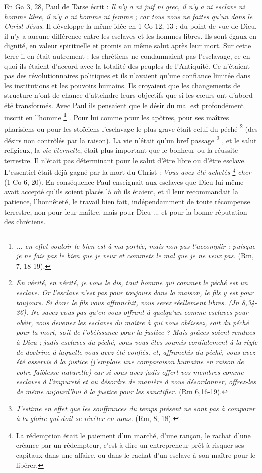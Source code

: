  En Ga 3, 28, Paul de Tarse écrit : \emph{Il n'y a ni juif ni grec, il n'y a ni esclave ni homme libre, il n'y a ni homme ni femme ; car tous vous ne faites qu'un dans le Christ Jésus}. Il développe la même idée en 1 Co 12, 13 : du point de vue de Dieu, il n'y a aucune différence entre les esclaves et les hommes libres. Ils sont égaux en dignité, en valeur spirituelle et promis au même salut après leur mort. Sur cette terre il en était autrement : les chrétiens ne condamnaient pas l'esclavage, ce en quoi ils étaient d'accord avec la totalité des peuples de l'Antiquité. Ce n'étaient pas des révolutionnaires politiques et ils n'avaient qu'une confiance limitée dans les institutions et les pouvoirs humains. Ils croyaient que les changements de structure n'ont de chance d'atteindre leurs objectifs que si les cœurs ont d'abord été transformés. Avec Paul ils pensaient que le désir du mal est profondément inscrit en l'homme%
\footnote{\emph{... en effet vouloir le bien est à ma portée, mais non pas l'accomplir : puisque je ne fais pas le bien que je veux et commets le mal que je ne veux pas.} (Rm, 7, 18-19).}%
. Pour lui comme pour les apôtres, pour ses maîtres pharisiens ou pour les stoïciens l'esclavage le plus grave était celui du péché%
\footnote{\emph{En vérité, en vérité, je vous le dis, tout homme qui commet le péché est un esclave. Or l'esclave n'est pas pour toujours dans la maison, le fils y est pour toujours. Si donc le fils vous affranchit, vous serez réellement libres. \emph{(Jn 8,34-36).} Ne savez-vous pas qu'en vous offrant à quelqu'un comme esclaves pour obéir, vous devenez les esclaves du maître à qui vous obéissez, soit du péché pour la mort, soit de l'obéissance pour la justice ? Mais grâces soient rendues à Dieu ; jadis esclaves du péché, vous vous êtes soumis cordialement à la règle de doctrine à laquelle vous avez été confiés, et, affranchis du péché, vous avez été asservis à la justice (j'emploie une comparaison humaine en raison de votre faiblesse naturelle) car si vous avez jadis offert vos membres comme esclaves à l'impureté et au désordre de manière à vous désordonner, offrez-les de même aujourd'hui à la justice pour les sanctifier.} (Rm 6,16-19).}
(des désirs non contrôlés par la raison). La vie n'était qu'un bref passage%
\footnote{\emph{J'estime en effet que les souffrances du temps présent ne sont pas à comparer à la gloire qui doit se révéler en nous.} (Rm, 8, 18).}%
, et le salut religieux, la \emph{vie éternelle}, était plus important que le bonheur ou la réussite terrestre. Il n'était pas déterminant pour le salut d'être libre ou d'être esclave. L'essentiel était déjà gagné par la mort du Christ : \emph{Vous avez été achetés%
\footnote{La rédemption était le paiement d'un marché, d'une rançon, le rachat d'une créance par un rédempteur, c'est-à-dire un entrepreneur prêt à risquer ses capitaux dans une affaire, ou dans le rachat d'un esclave à son maître pour le libérer.} 
cher} (1 Co 6, 20). En conséquence Paul enseignait aux esclaves que Dieu lui-même avait accepté qu'ils soient placés là où ils étaient, et il leur recommandait la patience, l'honnêteté, le travail bien fait, indépendamment de toute récompense terrestre, non pour leur maître, mais pour Dieu ... et pour la bonne réputation des chrétiens. 

